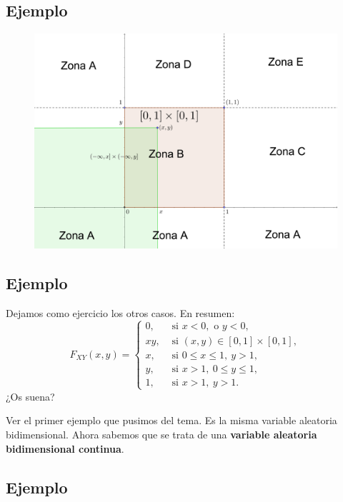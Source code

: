 \documentclass[]{book}
\begin{document}
\hypertarget{ejemplo-47}{%
\subsection{Ejemplo}\label{ejemplo-47}}

\begin{figure}
\includegraphics[width=700px]{Images/VaUniformeBidi4} \end{figure}

\hypertarget{ejemplo-48}{%
\subsection{Ejemplo}\label{ejemplo-48}}

Dejamos como ejercicio los otros casos. En resumen:
\[
F_{XY}(x,y)=\begin{cases}
0, & \mbox{ si }x<0, \mbox{ o }y<0,\\
x y, & \mbox{ si }(x,y)\in [0,1]\times [0,1],\\
x, & \mbox{ si }0\leq x\leq 1,\ y>1,\\
y, & \mbox{ si }x>1,\ 0\leq y\leq 1,\\
1, & \mbox{ si } x>1,\ y>1.
\end{cases}
\]
¿Os suena?

Ver el primer ejemplo que pusimos del tema. Es la misma variable aleatoria bidimensional.
Ahora sabemos que se trata de una \textbf{variable aleatoria bidimensional continua}.

\hypertarget{ejemplo-49}{%
\subsection{Ejemplo}\label{ejemplo-49}}
\end{document}
